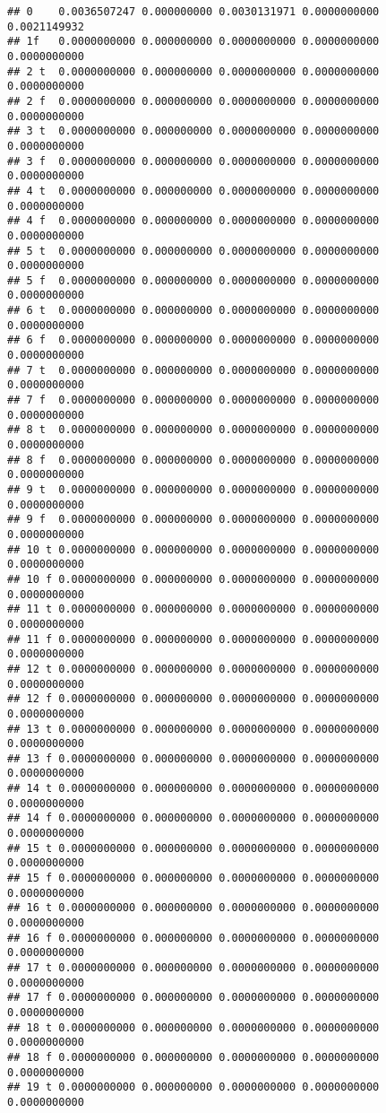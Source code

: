 \documentclass[]{article}
\begin{document}
\begin{verbatim}
## 0    0.0036507247 0.000000000 0.0030131971 0.0000000000 0.0021149932
## 1f   0.0000000000 0.000000000 0.0000000000 0.0000000000 0.0000000000
## 2 t  0.0000000000 0.000000000 0.0000000000 0.0000000000 0.0000000000
## 2 f  0.0000000000 0.000000000 0.0000000000 0.0000000000 0.0000000000
## 3 t  0.0000000000 0.000000000 0.0000000000 0.0000000000 0.0000000000
## 3 f  0.0000000000 0.000000000 0.0000000000 0.0000000000 0.0000000000
## 4 t  0.0000000000 0.000000000 0.0000000000 0.0000000000 0.0000000000
## 4 f  0.0000000000 0.000000000 0.0000000000 0.0000000000 0.0000000000
## 5 t  0.0000000000 0.000000000 0.0000000000 0.0000000000 0.0000000000
## 5 f  0.0000000000 0.000000000 0.0000000000 0.0000000000 0.0000000000
## 6 t  0.0000000000 0.000000000 0.0000000000 0.0000000000 0.0000000000
## 6 f  0.0000000000 0.000000000 0.0000000000 0.0000000000 0.0000000000
## 7 t  0.0000000000 0.000000000 0.0000000000 0.0000000000 0.0000000000
## 7 f  0.0000000000 0.000000000 0.0000000000 0.0000000000 0.0000000000
## 8 t  0.0000000000 0.000000000 0.0000000000 0.0000000000 0.0000000000
## 8 f  0.0000000000 0.000000000 0.0000000000 0.0000000000 0.0000000000
## 9 t  0.0000000000 0.000000000 0.0000000000 0.0000000000 0.0000000000
## 9 f  0.0000000000 0.000000000 0.0000000000 0.0000000000 0.0000000000
## 10 t 0.0000000000 0.000000000 0.0000000000 0.0000000000 0.0000000000
## 10 f 0.0000000000 0.000000000 0.0000000000 0.0000000000 0.0000000000
## 11 t 0.0000000000 0.000000000 0.0000000000 0.0000000000 0.0000000000
## 11 f 0.0000000000 0.000000000 0.0000000000 0.0000000000 0.0000000000
## 12 t 0.0000000000 0.000000000 0.0000000000 0.0000000000 0.0000000000
## 12 f 0.0000000000 0.000000000 0.0000000000 0.0000000000 0.0000000000
## 13 t 0.0000000000 0.000000000 0.0000000000 0.0000000000 0.0000000000
## 13 f 0.0000000000 0.000000000 0.0000000000 0.0000000000 0.0000000000
## 14 t 0.0000000000 0.000000000 0.0000000000 0.0000000000 0.0000000000
## 14 f 0.0000000000 0.000000000 0.0000000000 0.0000000000 0.0000000000
## 15 t 0.0000000000 0.000000000 0.0000000000 0.0000000000 0.0000000000
## 15 f 0.0000000000 0.000000000 0.0000000000 0.0000000000 0.0000000000
## 16 t 0.0000000000 0.000000000 0.0000000000 0.0000000000 0.0000000000
## 16 f 0.0000000000 0.000000000 0.0000000000 0.0000000000 0.0000000000
## 17 t 0.0000000000 0.000000000 0.0000000000 0.0000000000 0.0000000000
## 17 f 0.0000000000 0.000000000 0.0000000000 0.0000000000 0.0000000000
## 18 t 0.0000000000 0.000000000 0.0000000000 0.0000000000 0.0000000000
## 18 f 0.0000000000 0.000000000 0.0000000000 0.0000000000 0.0000000000
## 19 t 0.0000000000 0.000000000 0.0000000000 0.0000000000 0.0000000000

\end{verbatim}
\end{document}
